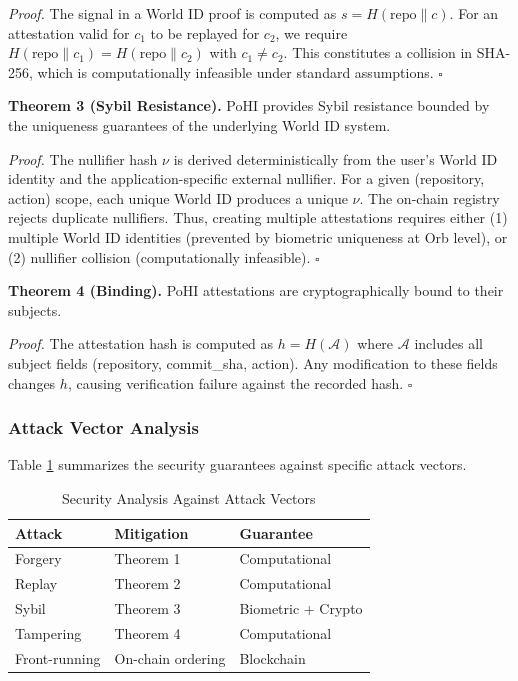 \documentclass[conference]{IEEEtran}
\begin{document}
\textit{Proof.} The signal in a World ID proof is computed as $s = H(\text{repo} \| c)$. For an attestation valid for $c_1$ to be replayed for $c_2$, we require $H(\text{repo} \| c_1) = H(\text{repo} \| c_2)$ with $c_1 \neq c_2$. This constitutes a collision in SHA-256, which is computationally infeasible under standard assumptions. \hfill $\square$

\textbf{Theorem 3 (Sybil Resistance).} PoHI provides Sybil resistance bounded by the uniqueness guarantees of the underlying World ID system.

\textit{Proof.} The nullifier hash $\nu$ is derived deterministically from the user's World ID identity and the application-specific external nullifier. For a given (repository, action) scope, each unique World ID produces a unique $\nu$. The on-chain registry rejects duplicate nullifiers. Thus, creating multiple attestations requires either (1) multiple World ID identities (prevented by biometric uniqueness at Orb level), or (2) nullifier collision (computationally infeasible). \hfill $\square$

\textbf{Theorem 4 (Binding).} PoHI attestations are cryptographically bound to their subjects.

\textit{Proof.} The attestation hash is computed as $h = H(\mathcal{A})$ where $\mathcal{A}$ includes all subject fields (repository, commit\_sha, action). Any modification to these fields changes $h$, causing verification failure against the recorded hash. \hfill $\square$

\subsubsection{Attack Vector Analysis}

Table \ref{tab:security} summarizes the security guarantees against specific attack vectors.

\begin{table}[h]
\centering
\caption{Security Analysis Against Attack Vectors}
\label{tab:security}
\begin{tabular}{lll}
\toprule
\textbf{Attack} & \textbf{Mitigation} & \textbf{Guarantee} \\
\midrule
Forgery & Theorem 1 & Computational \\
Replay & Theorem 2 & Computational \\
Sybil & Theorem 3 & Biometric + Crypto \\
Tampering & Theorem 4 & Computational \\
Front-running & On-chain ordering & Blockchain \\
\bottomrule
\end{tabular}
\end{table}
\end{document}
